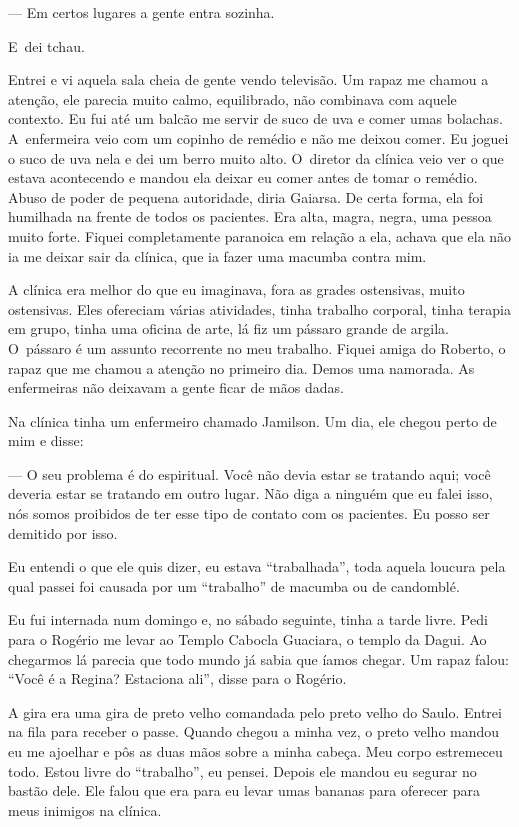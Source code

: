 --- Em certos lugares a gente entra sozinha. 

E~dei tchau.

Entrei e vi aquela sala cheia de gente vendo televisão. Um rapaz me
chamou a atenção, ele parecia muito calmo, equilibrado, não combinava
com aquele contexto. Eu fui até um balcão me servir de suco de uva e
comer umas bolachas. A~enfermeira veio com um copinho de remédio e não
me deixou comer. Eu joguei o suco de uva nela e dei um berro muito alto.
O~diretor da clínica veio ver o que estava acontecendo e mandou ela
deixar eu comer antes de tomar o remédio. Abuso de poder de pequena
autoridade, diria Gaiarsa. De certa forma, ela foi humilhada na frente
de todos os pacientes. Era alta, magra, negra, uma pessoa muito forte.
Fiquei completamente paranoica em relação a ela, achava que ela não ia
me deixar sair da clínica, que ia fazer uma macumba contra mim.

A clínica era melhor do que eu imaginava, fora as grades ostensivas,
muito ostensivas. Eles ofereciam várias atividades, tinha trabalho
corporal, tinha terapia em grupo, tinha uma oficina de arte, lá fiz um
pássaro grande de argila. O~pássaro é um assunto recorrente no meu
trabalho. Fiquei amiga do Roberto, o rapaz que me chamou a atenção no
primeiro dia. Demos uma namorada. As enfermeiras não deixavam a gente
ficar de mãos dadas.

Na clínica tinha um enfermeiro chamado Jamilson. Um dia, ele chegou
perto de mim e disse:

--- O seu problema é do espiritual. Você não devia estar se tratando
aqui; você deveria estar se tratando em outro lugar. Não diga a ninguém
que eu falei isso, nós somos proibidos de ter esse tipo de contato com
os pacientes. Eu posso ser demitido por isso.

Eu entendi o que ele quis dizer, eu estava ``trabalhada'', toda aquela
loucura pela qual passei foi causada por um ``trabalho'' de macumba ou
de candomblé.

Eu fui internada num domingo e, no sábado seguinte, tinha a tarde livre.
Pedi para o Rogério me levar ao Templo Cabocla Guaciara, o templo da
Dagui. Ao chegarmos lá parecia que todo mundo já sabia que íamos chegar.
Um rapaz falou: ``Você é a Regina? Estaciona ali'', disse para o
Rogério.

A gira era uma gira de preto velho comandada pelo preto velho do Saulo.
Entrei na fila para receber o passe. Quando chegou a minha vez, o preto
velho mandou eu me ajoelhar e pôs as duas mãos sobre a minha cabeça. Meu
corpo estremeceu todo. Estou livre do ``trabalho'', eu pensei. Depois
ele mandou eu segurar no bastão dele. Ele falou que era para eu levar
umas bananas para oferecer para meus inimigos na clínica.

